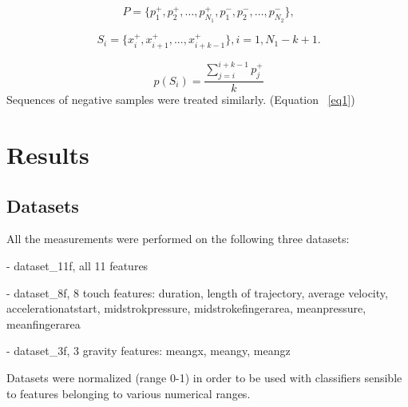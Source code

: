 \documentclass[referee]{raa}            %
\begin{document}
\begin{equation}\label{eq2}
  \ P = \{p_1^+,p_2^+,… ,p_{N_1}^+,p_1^-,p_2^-,… ,p_{N_2}^-\},
\end{equation}

\begin{equation}\label{eq3}
  \ S_i = \{x_i^+,x_{i+1}^+,...,x_{i+k-1}^+\}, i = 1, N_1-k+1.
\end{equation}

\begin{equation}\label{eq4}
  \ p(S_i )=\frac{\sum_{j=i}^{i+k-1} p_j^+}{k}
\end{equation}
Sequences of negative samples were treated similarly. (Equation ~\eqref{eq1})

\section{Results}
\label{sect:res}
\subsection{Datasets}

All the measurements were performed on the following three datasets: \par
-	dataset\_11f, all 11 features \par
-	dataset\_8f, 8 touch features: duration, length of trajectory, average velocity, accelerationatstart, midstrokpressure, midstrokefingerarea, meanpressure, meanfingerarea \par
-	dataset\_3f, 3 gravity features: meangx, meangy, meangz \par
Datasets were normalized (range 0-1) in order to be used with classifiers sensible to features belonging to various numerical ranges.
\end{document}

